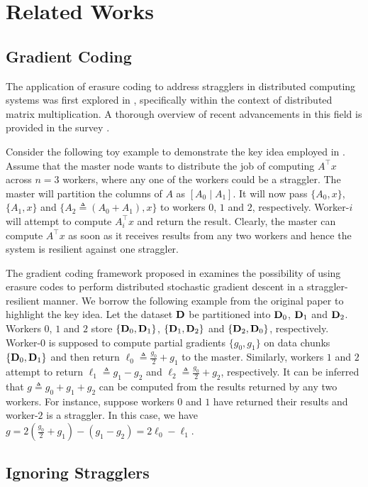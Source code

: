 \section{Related Works}\label{ch2:sec:related_work}

\subsection{Gradient Coding}

The application of erasure coding to address stragglers in distributed computing systems was first explored in \cite{Lee16}, specifically within the context of distributed matrix multiplication. A thorough overview of recent advancements in this field is provided in the survey \cite{codedComputingSurvey}.

Consider the following toy example to demonstrate the key idea employed in \cite{Lee16}. Assume that the master node wants to distribute the job of computing $A^\top x$ across $n=3$ workers, where any one of the workers could be a straggler. The master will partition the columns of $A$ as $[A_0\mid A_1]$. It will now pass $\{A_0,x\}$, $\{A_1,x\}$ and $\{A_2\triangleq(A_0+A_1),x\}$ to workers $0$, $1$ and $2$, respectively. Worker-$i$ will attempt to compute $A_i^\top x$ and return the result. Clearly, the master can compute $A^\top x$ as soon as it receives results from any two workers and hence the system is resilient against one straggler.

The gradient coding framework proposed in \cite{grad_coding} examines the possibility of using erasure codes to perform distributed stochastic gradient descent in a straggler-resilient manner. We borrow the following example from the original paper to highlight the key idea. Let the dataset $\mathbf{D}$ be partitioned into $\mathbf{D}_0$, $\mathbf{D}_1$ and $\mathbf{D}_2$. Workers $0$, $1$ and $2$ store $\{\mathbf{D}_0,\mathbf{D}_1\}$, $\{\mathbf{D}_1,\mathbf{D}_2\}$ and $\{\mathbf{D}_2,\mathbf{D}_0\}$, respectively. Worker-$0$ is supposed to compute partial gradients $\{g_0,g_1\}$ on data chunks $\{\mathbf{D}_0,\mathbf{D}_1\}$ and then return $\ell_0\triangleq\frac{g_0}{2}+g_1$ to the master. Similarly, workers $1$ and $2$ attempt to return $\ell_1\triangleq g_1-g_2$ and $\ell_2\triangleq\frac{g_0}{2}+g_2$, respectively. It can be inferred that $g\triangleq g_0+g_1+g_2$ can be computed from the results returned by any two workers. For instance, suppose workers $0$ and $1$ have returned their results and worker-$2$ is a straggler. In this case, we have $g=2(\frac{g_0}{2}+g_1)-(g_1-g_2)=2\ell_0-\ell_1$.

\subsection{Ignoring Stragglers}

